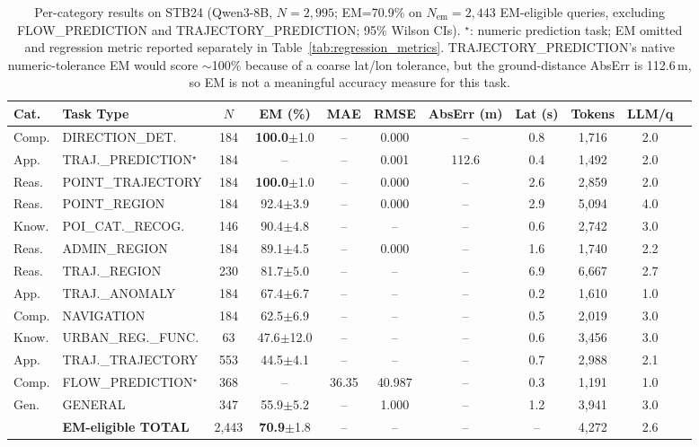 \begin{table}[!htbp]
\centering
\caption{Per-category results on STB24 (Qwen3-8B, $N=2{,}995$; EM=70.9\% on $N_\text{em}=2{,}443$ EM-eligible queries, excluding FLOW\_PREDICTION and TRAJECTORY\_PREDICTION; 95\% Wilson CIs).  $^\star$: numeric prediction task; EM omitted and regression metric reported separately in Table~\ref{tab:regression_metrics}.  TRAJECTORY\_PREDICTION's native numeric-tolerance EM would score $\sim$100\% because of a coarse lat/lon tolerance, but the ground-distance AbsErr is 112.6\,m, so EM is not a meaningful accuracy measure for this task.}
\label{tab:stbench_full}
\scriptsize
\begin{tabular}{llccccccccc}
\toprule
Cat. & Task Type & $N$ & EM (\%) & MAE & RMSE & AbsErr (m) & Lat (s) & Tokens & LLM/q \\
\midrule
Comp.  & DIRECTION\_DET.          & 184 & \textbf{100.0}\tiny{$\pm$1.0} & --    & 0.000  & --     & 0.8 & 1{,}716 & 2.0 \\
App.   & TRAJ.\_PREDICTION$^\star$ & 184 & --                           & --    & 0.001  & 112.6  & 0.4 & 1{,}492 & 2.0 \\
Reas.  & POINT\_TRAJECTORY        & 184 & \textbf{100.0}\tiny{$\pm$1.0} & --    & 0.000  & --     & 2.6 & 2{,}859 & 2.0 \\
Reas.  & POINT\_REGION            & 184 & 92.4\tiny{$\pm$3.9}           & --    & 0.000  & --     & 2.9 & 5{,}094 & 4.0 \\
Know.  & POI\_CAT.\_RECOG.        & 146 & 90.4\tiny{$\pm$4.8}           & --    & --     & --     & 0.6 & 2{,}742 & 3.0 \\
Reas.  & ADMIN\_REGION            & 184 & 89.1\tiny{$\pm$4.5}           & --    & 0.000  & --     & 1.6 & 1{,}740 & 2.2 \\
Reas.  & TRAJ.\_REGION            & 230 & 81.7\tiny{$\pm$5.0}           & --    & --     & --     & 6.9 & 6{,}667 & 2.7 \\
App.   & TRAJ.\_ANOMALY           & 184 & 67.4\tiny{$\pm$6.7}           & --    & --     & --     & 0.2 & 1{,}610 & 1.0 \\
Comp.  & NAVIGATION               & 184 & 62.5\tiny{$\pm$6.9}           & --    & --     & --     & 0.5 & 2{,}019 & 3.0 \\
Know.  & URBAN\_REG.\_FUNC.       & 63  & 47.6\tiny{$\pm$12.0}          & --    & --     & --     & 0.6 & 3{,}456 & 3.0 \\
App.   & TRAJ.\_TRAJECTORY        & 553 & 44.5\tiny{$\pm$4.1}           & --    & --     & --     & 0.7 & 2{,}988 & 2.1 \\
Comp.  & FLOW\_PREDICTION$^\star$ & 368 & --                           & 36.35 & 40.987 & --     & 0.3 & 1{,}191 & 1.0 \\
Gen.   & GENERAL                  & 347 & 55.9\tiny{$\pm$5.2}           & --    & 1.000  & --     & 1.2 & 3{,}941 & 3.0 \\
\midrule
& \textbf{EM-eligible TOTAL}  & 2{,}443 & \textbf{70.9}\tiny{$\pm$1.8} & -- & -- & -- & -- & 4{,}272 & 2.6 \\
\bottomrule
\end{tabular}
\end{table}

